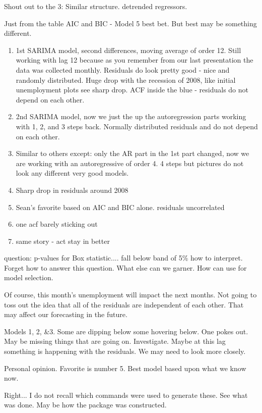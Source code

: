 {		Shout out to the 3: Similar structure.
		detrended regressors.
		
		Just from the table AIC and BIC - Model 5 best bet.  But best may be something different.
		
		\begin{enumerate}
			\item 1st SARIMA model, second differences, moving average of order 12.
			Still working with lag 12 because as you remember from our last presentation the data was collected monthly.
			Residuals do look pretty good - nice and randomly distributed. 
			Huge drop with the recession of 2008, like initial unemployment plots see sharp drop.
			ACF inside the blue - residuals do not depend on each other.
			\item 2nd SARIMA model, 
			now we just the up the autoregression parts working with 1, 2, and 3 steps back.  
			Normally distributed residuals and do not depend on each other.
			\item  Similar to others except:
			only the AR part in the 1st part changed, now we are working with an autoregressive of order 4.
			4 steps but pictures do not look any different very good models.
			\item  Sharp drop in residuals around 2008
			\item Sean's favorite based on AIC and BIC alone. 
			residuals uncorrelated
			\item one acf barely sticking out
			\item same story - act stay in better
		\end{enumerate}
		
		question: p-values for Box statistic.... fall below band of 5\% how to interpret. Forget how to answer this question. What else can we garner. How can use for model selection.
		
		Of course, this month's unemployment will impact the next months. Not going to toss out the idea that all of the residuals are independent of each other. That may affect our forecasting in the future.
		
		Models 1, 2, \&3. Some are dipping below some hovering below.  One pokes out.  May be missing things that are going on.  Investigate.  Maybe at this lag something is happening with the residuals. We may need to look more closely.
		
		Personal opinion.  Favorite is number 5.  Best model based upon what we know now.
		
		Right... I do not recall which commands were used to generate these. See what was done. May be how the package was constructed.


}
